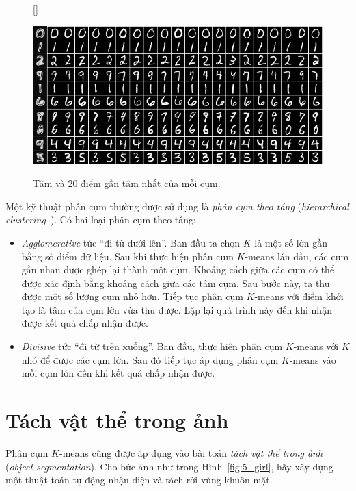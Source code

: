 \begin{figure}[t]
[\FBwidth]
{\caption{
Tâm và 20 điểm gần tâm nhất của mỗi cụm.
}
\label{fig:5_knn}}
{ %
\includegraphics[width=.65\textwidth]{Chapters/03_SimpleML/4_kmeans/kmeans_knn_gray.png}
}
\end{figure}

Một kỹ thuật phân cụm thường được sử dụng là \textit{phân cụm theo
tầng} (\textit{hierarchical clustering}~\cite{blei2008hierarchical}). Có hai
loại phân cụm theo tầng:

\begin{itemize}
\item \textit{Agglomerative} tức ``đi từ dưới lên''. Ban đầu ta chọn $K$ là một
số lớn gần bằng số điểm dữ liệu. Sau khi thực hiện phân cụm $K$-means lần
đầu, các cụm gần nhau được ghép lại thành một cụm. Khoảng cách giữa các cụm có thể được xác định bằng khoảng cách giữa các tâm cụm. Sau bước này, ta thu được một
số lượng cụm nhỏ hơn. Tiếp tục phân cụm $K$-means với điểm khởi tạo
là tâm của cụm lớn vừa thu được. Lặp lại quá trình này đến khi nhận
được kết quả chấp nhận được.

\item \textit{Divisive} tức ``đi từ trên xuống''. Ban đầu, thực hiện phân
cụm $K$-means với $K$ nhỏ để được các cụm lớn. Sau đó tiếp tục áp dụng phân cụm $K$-means vào mỗi cụm lớn đến khi kết quả chấp nhận được.

\end{itemize}

\section{Tách vật thể trong ảnh}


Phân cụm $K$-means cũng được áp dụng vào bài toán \textit{tách vật thể trong ảnh} (\textit{object segmentation}). Cho bức ảnh như trong Hình~\ref{fig:5_girl}, hãy xây dựng một thuật toán tự động nhận diện và tách rời vùng khuôn mặt.

